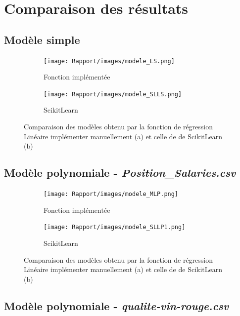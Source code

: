 \documentclass[french]{article}
\begin{document}
\newpage

\section{Comparaison des résultats}

\subsection{Modèle simple}

\begin{figure}[!htbp]
    \centering
    \begin{subfigure}[b]{0.49\textwidth}
         \centering
         \texttt{[image: Rapport/images/modele\_LS.png]}
         \caption{Fonction implémentée}
        \label{fig:modele_LS}
    \end{subfigure}
    \begin{subfigure}[b]{0.5\textwidth}
         \centering
         \texttt{[image: Rapport/images/modele\_SLLS.png]}
         \caption{ScikitLearn}
        \label{fig:modele_SLLS}
    \end{subfigure}
    \caption{Comparaison des modèles obtenu par la fonction de régression Linéaire implémenter manuellement (a) et celle de de ScikitLearn (b)}
\end{figure}


\subsection{Modèle polynomiale - \textit{Position\_Salaries.csv}}

\begin{figure}[!htbp]
    \centering
    \begin{subfigure}[b]{0.49\textwidth}
         \centering
         \texttt{[image: Rapport/images/modele\_MLP.png]}
         \caption{Fonction implémentée}
        \label{fig:modele_LP1}
    \end{subfigure}
    \begin{subfigure}[b]{0.5\textwidth}
         \centering
         \texttt{[image: Rapport/images/modele\_SLLP1.png]}
         \caption{ScikitLearn}
        \label{fig:modele_SLLP1}
    \end{subfigure}
    \caption{Comparaison des modèles obtenu par la fonction de régression Linéaire implémenter manuellement (a) et celle de de ScikitLearn (b)}
\end{figure}

\subsection{Modèle polynomiale - \textit{qualite-vin-rouge.csv}}
\end{document}

